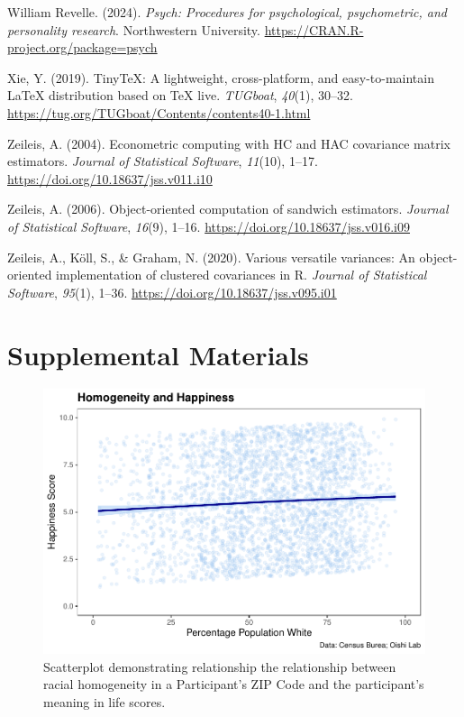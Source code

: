 \documentclass[
  man,floatsintext]{apa7}
\newlength{\cslhangindent}
\newlength{\cslentryspacingunit} %
\newenvironment{CSLReferences}[2] %
 {%
  \setlength{\parindent}{0pt}
  \ifodd #1
  \let\oldpar\par
  \def\par{\hangindent=\cslhangindent\oldpar}
  \fi
  \setlength{\parskip}{#2\cslentryspacingunit}
 }%
 {}
\begin{document}
\begin{CSLReferences}{1}{0}
\leavevmode{}%
William Revelle. (2024). \emph{Psych: Procedures for psychological, psychometric, and personality research}. Northwestern University. \url{https://CRAN.R-project.org/package=psych}

\leavevmode{}%
Xie, Y. (2019). TinyTeX: A lightweight, cross-platform, and easy-to-maintain LaTeX distribution based on TeX live. \emph{TUGboat}, \emph{40}(1), 30--32. \url{https://tug.org/TUGboat/Contents/contents40-1.html}

\leavevmode{}%
Zeileis, A. (2004). Econometric computing with {HC} and {HAC} covariance matrix estimators. \emph{Journal of Statistical Software}, \emph{11}(10), 1--17. \url{https://doi.org/10.18637/jss.v011.i10}

\leavevmode{}%
Zeileis, A. (2006). Object-oriented computation of sandwich estimators. \emph{Journal of Statistical Software}, \emph{16}(9), 1--16. \url{https://doi.org/10.18637/jss.v016.i09}

\leavevmode{}%
Zeileis, A., Köll, S., \& Graham, N. (2020). Various versatile variances: An object-oriented implementation of clustered covariances in {R}. \emph{Journal of Statistical Software}, \emph{95}(1), 1--36. \url{https://doi.org/10.18637/jss.v095.i01}

\end{CSLReferences}

\newpage

\hypertarget{Supplemental-Materials}{%
\section{Supplemental Materials}\label{Supplemental-Materials}}

\begin{figure}[H]
\includegraphics[width=0.7\linewidth]{Richness-Diversity-Markdown_files/figure-latex/b-path-scatterplot-1} \caption{Scatterplot demonstrating relationship the relationship between racial homogeneity in a Participant's ZIP Code and the participant's meaning in life scores.}\label{fig:happy-appendix}
\end{figure}
\end{document}
